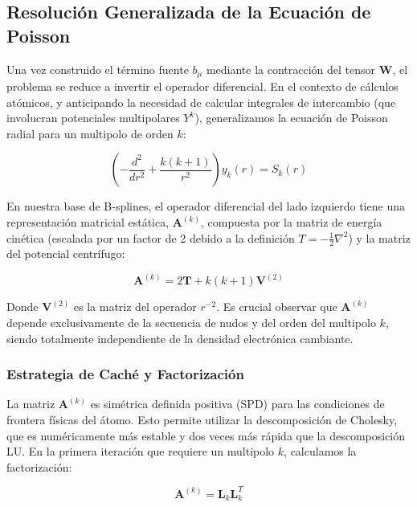 \documentclass[12pt, a4paper, oneside, spanish]{article}
\begin{document}
\subsection{Resolución Generalizada de la Ecuación de Poisson}

Una vez construido el término fuente \( b_\mu \) mediante la contracción del tensor \( \mathbf{W} \), el problema se reduce a invertir el operador diferencial. En el contexto de cálculos atómicos, y anticipando la necesidad de calcular integrales de intercambio (que involucran potenciales multipolares \( Y^k \)), generalizamos la ecuación de Poisson radial para un multipolo de orden \( k \):

\begin{equation}
\label{eq:gen_poisson}
\left( -\frac{d^2}{dr^2} + \frac{k(k+1)}{r^2} \right) y_k(r) = S_k(r)
\end{equation}

En nuestra base de B-splines, el operador diferencial del lado izquierdo tiene una representación matricial estática, \(\mathbf{A}^{(k)}\), compuesta por la matriz de energía cinética (escalada por un factor de 2 debido a la definición \( T = -\frac{1}{2}\nabla^2 \)) y la matriz del potencial centrífugo:

\begin{equation}
\mathbf{A}^{(k)} = 2\mathbf{T} + k(k+1)\mathbf{V}^{(2)}
\end{equation}

Donde \( \mathbf{V}^{(2)} \) es la matriz del operador \( r^{-2} \). Es crucial observar que \(\mathbf{A}^{(k)}\) depende exclusivamente de la secuencia de nudos y del orden del multipolo \( k \), siendo totalmente independiente de la densidad electrónica cambiante.

\subsubsection{Estrategia de Caché y Factorización}

La matriz \(\mathbf{A}^{(k)}\) es simétrica definida positiva (SPD) para las condiciones de frontera físicas del átomo. Esto permite utilizar la descomposición de Cholesky, que es numéricamente más estable y dos veces más rápida que la descomposición LU.
En la primera iteración que requiere un multipolo \( k \), calculamos la factorización:

\begin{equation}
\mathbf{A}^{(k)} = \mathbf{L}_k \mathbf{L}_k^T
\end{equation}
\end{document}
